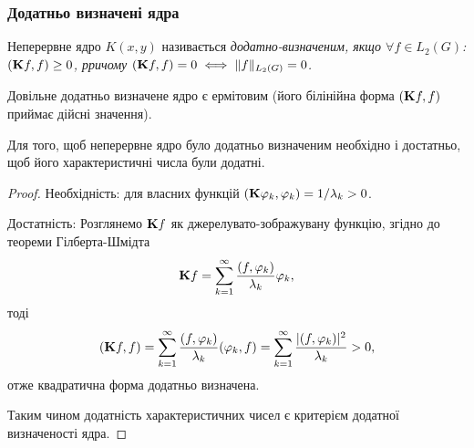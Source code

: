 % 


% 

% 


% 
% 
% 
% 


\subsubsection{Додатньо визначені ядра}

\begin{definition}
    Неперервне ядро $K(x, y)$ називається \it{додатно-визначеним}, якщо $\forall f \in L_2(G)$: $(\bf{K}f, f) \ge 0$, рричому $(\bf{K}f, f) = 0 \iff \|f\|_{L_2(G)} = 0$.
\end{definition}

\begin{remark}
    Довільне додатньо визначене ядро є ермітовим (його білінійна форма $(\bf{K}f, f)$ приймає дійсні значення).
\end{remark}

\begin{lemma}
    Для того, щоб неперервне ядро було додатньо визначеним необхідно і достатньо, щоб його характеристичні числа були додатні.
\end{lemma}

\begin{proof}
    Необхідність: для власних функцій $(\bf{K} \phi_k, \phi_k) = 1 / \lambda_k > 0$. \medskip

    Достатність: Розглянемо $\bf{K} f$ як джерелувато-зображувану функцію, згідно до теореми Гілберта-Шмідта
    \begin{equation}
        \bf{K} f = \sum_{k = 1}^\infty \frac{(f, \phi_k)}{\lambda_k} \phi_k,
    \end{equation}
    тоді 
    \begin{equation}
        (\bf{K}f, f) = \Sum_{k = 1}^\infty \dfrac{(f, \phi_k)}{\lambda_k} (\phi_k, f) = \Sum_{k = 1}^\infty \dfrac{|(f, \phi_k)|^2}{\lambda_k} > 0,
    \end{equation}
    отже квадратична форма додатньо визначена. \medskip

    Таким чином додатність характеристичних чисел є критерієм додатної визначеності ядра.
\end{proof}

